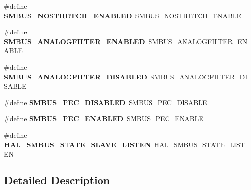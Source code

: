 \begin{DoxyCompactItemize}
\item 
\hypertarget{group___h_a_l___s_m_b_u_s___aliased___defines_gac13cdfb033be4b09e90f8d65745d48c2}{\#define {\bfseries S\-M\-B\-U\-S\-\_\-\-N\-O\-S\-T\-R\-E\-T\-C\-H\-\_\-\-E\-N\-A\-B\-L\-E\-D}~S\-M\-B\-U\-S\-\_\-\-N\-O\-S\-T\-R\-E\-T\-C\-H\-\_\-\-E\-N\-A\-B\-L\-E}\label{group___h_a_l___s_m_b_u_s___aliased___defines_gac13cdfb033be4b09e90f8d65745d48c2}

\item 
\hypertarget{group___h_a_l___s_m_b_u_s___aliased___defines_gaf636bd945246ff29d4e35ee3be6f1f6d}{\#define {\bfseries S\-M\-B\-U\-S\-\_\-\-A\-N\-A\-L\-O\-G\-F\-I\-L\-T\-E\-R\-\_\-\-E\-N\-A\-B\-L\-E\-D}~S\-M\-B\-U\-S\-\_\-\-A\-N\-A\-L\-O\-G\-F\-I\-L\-T\-E\-R\-\_\-\-E\-N\-A\-B\-L\-E}\label{group___h_a_l___s_m_b_u_s___aliased___defines_gaf636bd945246ff29d4e35ee3be6f1f6d}

\item 
\hypertarget{group___h_a_l___s_m_b_u_s___aliased___defines_ga2af661132b3a2cd8c964dc2104f8223d}{\#define {\bfseries S\-M\-B\-U\-S\-\_\-\-A\-N\-A\-L\-O\-G\-F\-I\-L\-T\-E\-R\-\_\-\-D\-I\-S\-A\-B\-L\-E\-D}~S\-M\-B\-U\-S\-\_\-\-A\-N\-A\-L\-O\-G\-F\-I\-L\-T\-E\-R\-\_\-\-D\-I\-S\-A\-B\-L\-E}\label{group___h_a_l___s_m_b_u_s___aliased___defines_ga2af661132b3a2cd8c964dc2104f8223d}

\item 
\hypertarget{group___h_a_l___s_m_b_u_s___aliased___defines_ga8f509e1a8b4bbcd2f687f066e8dafffb}{\#define {\bfseries S\-M\-B\-U\-S\-\_\-\-P\-E\-C\-\_\-\-D\-I\-S\-A\-B\-L\-E\-D}~S\-M\-B\-U\-S\-\_\-\-P\-E\-C\-\_\-\-D\-I\-S\-A\-B\-L\-E}\label{group___h_a_l___s_m_b_u_s___aliased___defines_ga8f509e1a8b4bbcd2f687f066e8dafffb}

\item 
\hypertarget{group___h_a_l___s_m_b_u_s___aliased___defines_ga446c885b16518a909013c12085584e21}{\#define {\bfseries S\-M\-B\-U\-S\-\_\-\-P\-E\-C\-\_\-\-E\-N\-A\-B\-L\-E\-D}~S\-M\-B\-U\-S\-\_\-\-P\-E\-C\-\_\-\-E\-N\-A\-B\-L\-E}\label{group___h_a_l___s_m_b_u_s___aliased___defines_ga446c885b16518a909013c12085584e21}

\item 
\hypertarget{group___h_a_l___s_m_b_u_s___aliased___defines_ga76b21c836a3097828fdb6635777414ae}{\#define {\bfseries H\-A\-L\-\_\-\-S\-M\-B\-U\-S\-\_\-\-S\-T\-A\-T\-E\-\_\-\-S\-L\-A\-V\-E\-\_\-\-L\-I\-S\-T\-E\-N}~H\-A\-L\-\_\-\-S\-M\-B\-U\-S\-\_\-\-S\-T\-A\-T\-E\-\_\-\-L\-I\-S\-T\-E\-N}\label{group___h_a_l___s_m_b_u_s___aliased___defines_ga76b21c836a3097828fdb6635777414ae}

\end{DoxyCompactItemize}


\subsection{Detailed Description}
